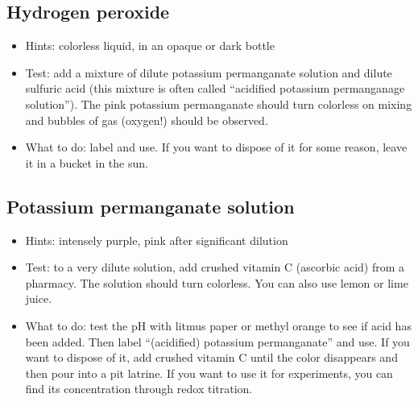 \subsection{Hydrogen peroxide}

\begin{itemize}

\item{Hints: colorless liquid, 
in an opaque or dark bottle}

\item{Test: add a mixture of dilute potassium permanganate solution 
and dilute sulfuric acid 
(this mixture is often called ``acidified potassium permanganage solution''). 
The pink potassium permanganate should turn colorless 
on mixing and bubbles of gas (oxygen!) should be observed.}

\item{What to do: label and use. 
If you want to dispose of it for some reason, 
leave it in a bucket in the sun.}

\end{itemize}

\subsection{Potassium permanganate solution}

\begin{itemize}

\item{Hints: intensely purple, 
pink after significant dilution}

\item{Test: to a very dilute solution, 
add crushed vitamin C (ascorbic acid) from a pharmacy. 
The solution should turn colorless. 
You can also use lemon or lime juice.}

\item{What to do: test the pH with litmus paper 
or methyl orange to see if acid has been added. 
Then label ``(acidified) potassium permanganate'' and use. 
If you want to dispose of it, 
add crushed vitamin C until the color disappears 
and then pour into a pit latrine. 
If you want to use it for experiments, 
you can find its concentration through redox titration.}

\end{itemize}

